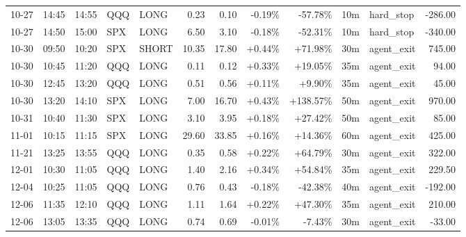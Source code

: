 \documentclass[11pt,a4paper,twoside]{article}
\begin{document}
\begin{center}
\begin{longtable}{>{\color{txtmain}}l l l l l r r r r r >{\color{txtmain}}l r}
10-27 & 14:45 & 14:55 & QQQ & LONG & 0.23 & 0.10 & \textcolor{lossred}{-0.19\%} & \textcolor{lossred}{-57.78\%} & 10m & hard\_stop & \textcolor{lossred}{-286.00} \\
10-27 & 14:50 & 15:00 & SPX & LONG & 6.50 & 3.10 & \textcolor{lossred}{-0.18\%} & \textcolor{lossred}{-52.31\%} & 10m & hard\_stop & \textcolor{lossred}{-340.00} \\
10-30 & 09:50 & 10:20 & SPX & SHORT & 10.35 & 17.80 & \textcolor{wingreen}{+0.44\%} & \textcolor{wingreen}{+71.98\%} & 30m & agent\_exit & \textcolor{wingreen}{745.00} \\
10-30 & 10:45 & 11:20 & QQQ & LONG & 0.11 & 0.12 & \textcolor{wingreen}{+0.33\%} & \textcolor{wingreen}{+19.05\%} & 35m & agent\_exit & \textcolor{wingreen}{94.00} \\
10-30 & 12:45 & 13:20 & QQQ & LONG & 0.51 & 0.56 & \textcolor{wingreen}{+0.11\%} & \textcolor{wingreen}{+9.90\%} & 35m & agent\_exit & \textcolor{wingreen}{45.00} \\
10-30 & 13:20 & 14:10 & SPX & LONG & 7.00 & 16.70 & \textcolor{wingreen}{+0.43\%} & \textcolor{wingreen}{+138.57\%} & 50m & agent\_exit & \textcolor{wingreen}{970.00} \\
10-31 & 10:40 & 11:30 & SPX & LONG & 3.10 & 3.95 & \textcolor{wingreen}{+0.18\%} & \textcolor{wingreen}{+27.42\%} & 50m & agent\_exit & \textcolor{wingreen}{85.00} \\
11-01 & 10:15 & 11:15 & SPX & LONG & 29.60 & 33.85 & \textcolor{wingreen}{+0.16\%} & \textcolor{wingreen}{+14.36\%} & 60m & agent\_exit & \textcolor{wingreen}{425.00} \\
11-21 & 13:25 & 13:55 & QQQ & LONG & 0.35 & 0.58 & \textcolor{wingreen}{+0.22\%} & \textcolor{wingreen}{+64.79\%} & 30m & agent\_exit & \textcolor{wingreen}{322.00} \\
12-01 & 10:30 & 11:05 & QQQ & LONG & 1.40 & 2.16 & \textcolor{wingreen}{+0.34\%} & \textcolor{wingreen}{+54.84\%} & 35m & agent\_exit & \textcolor{wingreen}{229.50} \\
12-04 & 10:25 & 11:05 & QQQ & LONG & 0.76 & 0.43 & \textcolor{lossred}{-0.18\%} & \textcolor{lossred}{-42.38\%} & 40m & agent\_exit & \textcolor{lossred}{-192.00} \\
12-06 & 11:35 & 12:10 & QQQ & LONG & 1.11 & 1.64 & \textcolor{wingreen}{+0.22\%} & \textcolor{wingreen}{+47.30\%} & 35m & agent\_exit & \textcolor{wingreen}{210.00} \\
12-06 & 13:05 & 13:35 & QQQ & LONG & 0.74 & 0.69 & \textcolor{lossred}{-0.01\%} & \textcolor{lossred}{-7.43\%} & 30m & agent\_exit & \textcolor{lossred}{-33.00} \\

\end{longtable}
\end{center}
\end{document}
